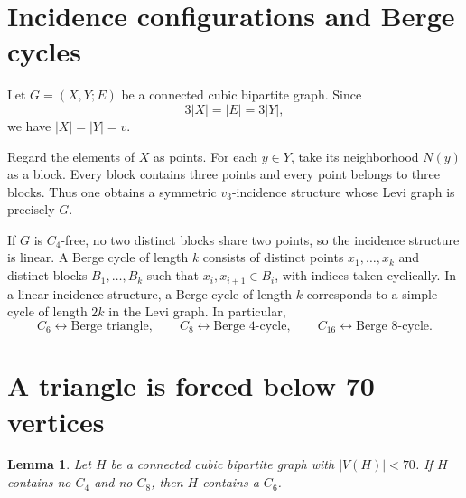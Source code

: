 \documentclass[11pt]{article}
\newtheorem{lemma}[theorem]{Lemma}
\theoremstyle{remark}
\newcommand{\Cfour}{C_4}
\newcommand{\Csix}{C_6}
\newcommand{\Ceight}{C_8}
\newcommand{\Csixteen}{C_{16}}
\newcommand{\vthree}{v_3}
\begin{document}
\section{Incidence configurations and Berge cycles}\label{sec:incidence}

Let \(G=(X,Y;E)\) be a connected cubic bipartite graph.  Since
\[
3|X|=|E|=3|Y|,
\]
we have \(|X|=|Y|=v\).

Regard the elements of \(X\) as points.  For each \(y\in Y\), take its neighborhood \(N(y)\) as a block.  Every block contains three points and every point belongs to three blocks.  Thus one obtains a symmetric \(\vthree\)-incidence structure whose Levi graph is precisely \(G\).

If \(G\) is \(\Cfour\)-free, no two distinct blocks share two points, so the incidence structure is linear.  A Berge cycle of length \(k\) consists of distinct points \(x_1,\ldots,x_k\) and distinct blocks \(B_1,\ldots,B_k\) such that \(x_i,x_{i+1}\in B_i\), with indices taken cyclically.  In a linear incidence structure, a Berge cycle of length \(k\) corresponds to a simple cycle of length \(2k\) in the Levi graph.  In particular,
\[
\Csix\longleftrightarrow\text{Berge triangle},\qquad
\Ceight\longleftrightarrow\text{Berge 4-cycle},\qquad
\Csixteen\longleftrightarrow\text{Berge 8-cycle}.
\]

\section{A triangle is forced below 70 vertices}\label{sec:triangle-forced}

\begin{lemma}\label{lem:triangle-forced}
Let \(H\) be a connected cubic bipartite graph with \(|V(H)|<70\).  If \(H\) contains no \(\Cfour\) and no \(\Ceight\), then \(H\) contains a \(\Csix\).
\end{lemma}
\end{document}
